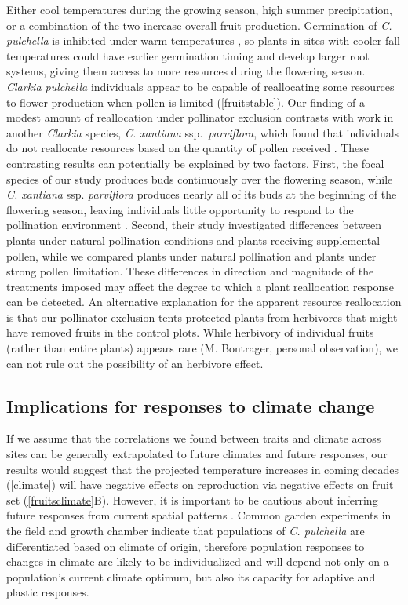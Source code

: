 \documentclass{article}
\begin{document}
Either cool temperatures during the growing season, high summer precipitation, or a combination of the two increase overall fruit production. Germination of \textit{C. pulchella} is inhibited under warm temperatures \citep{lewis1955genus}, so plants in sites with cooler fall temperatures could have earlier germination timing and develop larger root systems, giving them access to more resources during the flowering season. \textit{Clarkia pulchella} individuals appear to be capable of reallocating some resources to flower production when pollen is limited (\autoref{fruitstable}). Our finding of a modest amount of reallocation under pollinator exclusion contrasts with work in another \textit{Clarkia} species, \textit{C. xantiana} ssp.\ \textit{parviflora}, which found that individuals do not reallocate resources based on the quantity of pollen received \citep{runquist2013resource}. These contrasting results can potentially be explained by two factors. First, the focal species of our study produces buds continuously over the flowering season, while \textit{C. xantiana} ssp. \textit{parviflora} produces nearly all of its buds at the beginning of the flowering season, leaving individuals little opportunity to respond to the pollination environment \citep{runquist2013resource}. Second, their study investigated differences between plants under natural pollination conditions and plants receiving supplemental pollen, while we compared plants under natural pollination and plants under strong pollen limitation. These differences in direction and magnitude of the treatments imposed may affect the degree to which a plant reallocation response can be detected. An alternative explanation for the apparent resource reallocation is that our pollinator exclusion tents protected plants from herbivores that might have removed fruits in the control plots. While herbivory of individual fruits (rather than entire plants) appears rare (M. Bontrager, personal observation), we can not rule out the possibility of an herbivore effect.

\subsection*{Implications for responses to climate change}
If we assume that the correlations we found between traits and climate across sites can be generally extrapolated to future climates and future responses, our results would suggest that the projected temperature increases in coming decades (\autoref{climate}) will have negative effects on reproduction via negative effects on fruit set (\autoref{fruitsclimate}B). However, it is important to be cautious about inferring future responses from current spatial patterns \citep{warren2014}. Common garden experiments in the field and growth chamber \citep[M. Bontrager, unpublished data;][]{gamble2018floral} indicate that populations of \textit{C. pulchella} are differentiated based on climate of origin, therefore population responses to changes in climate are likely to be individualized and will depend not only on a population's current climate optimum, but also its capacity for adaptive and plastic responses.
\end{document}
